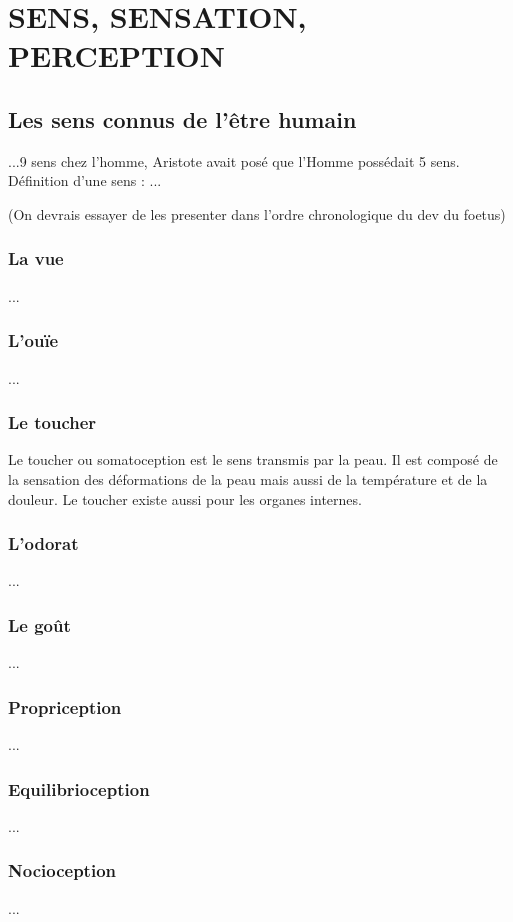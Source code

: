 \chapter{SENS, SENSATION, PERCEPTION}

\section{Les sens connus de l'être humain}
...9 sens chez l'homme, Aristote avait posé que l'Homme possédait 5 sens.
Définition d'une sens : ...

(On devrais essayer de les presenter dans l'ordre chronologique du dev du foetus)

\subsection{La vue}
...

\subsection{L'ouïe}
...

\subsection{Le toucher}
Le toucher ou somatoception est le sens transmis par la peau. Il est composé de la sensation des déformations de la peau mais aussi de la température et de la douleur. Le toucher existe aussi pour les organes internes.\par

\subsection{L'odorat}
...

\subsection{Le goût }
...

\subsection{Propriception}
...

\subsection{Equilibrioception}
...

\subsection{Nocioception}
...

